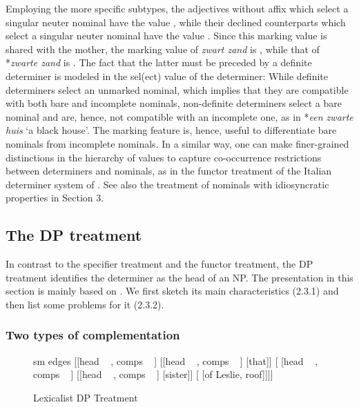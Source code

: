 \documentclass[output=paper]{langsci/langscibook}
\begin{document}
Employing the more specific subtypes, the adjectives without affix which select a singular 
neuter nominal have the value , while their declined counterparts which select 
a singular neuter nominal have the value . 
Since this {\sc marking} value is shared with the mother, the {\sc marking} value 
of \emph{zwart zand} is , while that of *\emph{zwarte zand} is . 
The fact that the latter must be preceded by a definite determiner
is modeled in the {\sc sel(ect)} value of the determiner: 
While definite determiners select an unmarked nominal, which implies that 
they are compatible with both bare and incomplete nominals,
non-definite determiners select a bare nominal and are, hence, not compatible 
with an incomplete one, as in *\emph{een zwarte huis} `a black house'. 
The {\sc marking} feature is, hence, useful to differentiate bare 
nominals from incomplete nominals.  
In a similar way, one can make finer-grained distinctions in the hierarchy of  
 values to capture co-occurrence restrictions between determiners and 
nominals, as in the functor treatment of the Italian determiner system of 
\citet{Allegranza06}. See also the treatment of nominals with idiosyncratic properties 
in Section 3. 


\subsection{The DP treatment} 


In contrast to the specifier treatment and the functor treatment, the DP 
treatment identifies the determiner as the head of an NP. The presentation in this section   
is mainly based on \citet{Netter94}. We first sketch its main characteristics (2.3.1)
and then list some problems for it (2.3.2). 


\subsubsection{Two types of complementation} 


\begin{figure}
	\centering
	\begin{forest}
sm edges
[{[{\sc head} ~  , {\sc comps} ~ \eliste]}
	[{[{\sc head} ~ , {\sc comps} ~ ]} [that]]
	[{ [{\sc head} ~  , {\sc comps} ~ \eliste]}
		[{[{\sc head} ~ , {\sc comps} ~ ]} [sister]]
		[ [of Leslie, roof]]]]
	\end{forest}
	\caption{\label{net} Lexicalist DP Treatment }
\end{figure}
\end{document}
